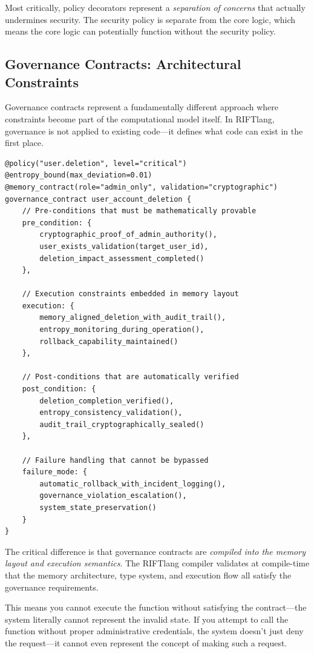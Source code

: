 Most critically, policy decorators represent a \textit{separation of concerns} that actually undermines security. The security policy is separate from the core logic, which means the core logic can potentially function without the security policy.

\subsection{Governance Contracts: Architectural Constraints}

Governance contracts represent a fundamentally different approach where constraints become part of the computational model itself. In RIFTlang, governance is not applied to existing code—it defines what code can exist in the first place.

\begin{lstlisting}[language=rift, caption=RIFTlang Governance Contract Approach]
@policy("user.deletion", level="critical")
@entropy_bound(max_deviation=0.01)
@memory_contract(role="admin_only", validation="cryptographic")
governance_contract user_account_deletion {
    // Pre-conditions that must be mathematically provable
    pre_condition: {
        cryptographic_proof_of_admin_authority(),
        user_exists_validation(target_user_id),
        deletion_impact_assessment_completed()
    },
    
    // Execution constraints embedded in memory layout
    execution: {
        memory_aligned_deletion_with_audit_trail(),
        entropy_monitoring_during_operation(),
        rollback_capability_maintained()
    },
    
    // Post-conditions that are automatically verified
    post_condition: {
        deletion_completion_verified(),
        entropy_consistency_validation(),
        audit_trail_cryptographically_sealed()
    },
    
    // Failure handling that cannot be bypassed
    failure_mode: {
        automatic_rollback_with_incident_logging(),
        governance_violation_escalation(),
        system_state_preservation()
    }
}
\end{lstlisting}

The critical difference is that governance contracts are \textit{compiled into the memory layout and execution semantics}. The RIFTlang compiler validates at compile-time that the memory architecture, type system, and execution flow all satisfy the governance requirements. 

This means you cannot execute the function without satisfying the contract—the system literally cannot represent the invalid state. If you attempt to call the function without proper administrative credentials, the system doesn't just deny the request—it cannot even represent the concept of making such a request.

